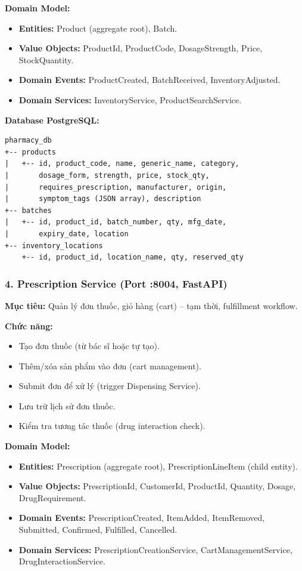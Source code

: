 \documentclass[12pt,a4paper]{article}
\begin{document}
\textbf{Domain Model:}
\begin{itemize}
    \item \textbf{Entities:} Product (aggregate root), Batch.
    \item \textbf{Value Objects:} ProductId, ProductCode, DosageStrength, Price, StockQuantity.
    \item \textbf{Domain Events:} ProductCreated, BatchReceived, InventoryAdjusted.
    \item \textbf{Domain Services:} InventoryService, ProductSearchService.
\end{itemize}

\textbf{Database PostgreSQL:}
\begin{verbatim}
pharmacy_db
+-- products
|   +-- id, product_code, name, generic_name, category,
|       dosage_form, strength, price, stock_qty,
|       requires_prescription, manufacturer, origin, 
|       symptom_tags (JSON array), description
+-- batches
|   +-- id, product_id, batch_number, qty, mfg_date,
|       expiry_date, location
+-- inventory_locations
    +-- id, product_id, location_name, qty, reserved_qty
\end{verbatim}

\subsubsection{4. Prescription Service (Port :8004, FastAPI)}

\textbf{Mục tiêu:} Quản lý đơn thuốc, giỏ hàng (cart) – tạm thời, fulfillment workflow.

\textbf{Chức năng:}
\begin{itemize}
    \item Tạo đơn thuốc (từ bác sĩ hoặc tự tạo).
    \item Thêm/xóa sản phẩm vào đơn (cart management).
    \item Submit đơn để xử lý (trigger Dispensing Service).
    \item Lưu trữ lịch sử đơn thuốc.
    \item Kiểm tra tương tác thuốc (drug interaction check).
\end{itemize}

\textbf{Domain Model:}
\begin{itemize}
    \item \textbf{Entities:} Prescription (aggregate root), PrescriptionLineItem (child entity).
    \item \textbf{Value Objects:} PrescriptionId, CustomerId, ProductId, Quantity, Dosage, DrugRequirement.
    \item \textbf{Domain Events:} PrescriptionCreated, ItemAdded, ItemRemoved, Submitted, Confirmed, Fulfilled, Cancelled.
    \item \textbf{Domain Services:} PrescriptionCreationService, CartManagementService, DrugInteractionService.
\end{itemize}
\end{document}
